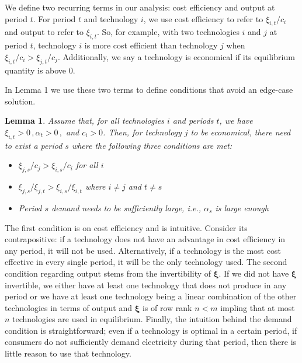 \documentclass[11pt,a4paper,leqno]{extarticle}
\newtheorem{lemma}{Lemma}
\begin{document}
	We define two recurring terms in our analysis: cost efficiency and output at period $t$. For period $t$ and technology $i$, we use cost efficiency to refer to $\xi_{i,t}/c_i$ and output to refer to $\xi_{i,t}$. So, for example, with two technologies $i$ and $j$ at period $t$, technology $i$ is more cost efficient than technology $j$ when $\xi_{i,t}/c_i > \xi_{j,t}/c_j$. Additionally, we say a technology is economical if its equilibrium quantity is above 0.
	
	In Lemma 1 we use these two terms to define conditions that avoid an edge-case solution.
	\begin{lemma}
		Assume that, for all technologies $i$ and periods $t$, we have $\xi_{i,t} > 0 \, , \alpha_t > 0 \, ,$ and $ c_i > 0$. Then, for technology $j$ to be economical, there need to exist a period $s$ where the following three conditions are met:
		\begin{itemize}
			\item $\xi_{j,s}/c_j > \xi_{i,s}/c_i$ for all $i$
			\item $\xi_{j,s}/\xi_{j,t} >  \xi_{i,s}/\xi_{i,t} $ where $i \neq j$ and $t \neq s$
			\item Period $s$ demand needs to be sufficiently large, i.e., $\alpha_s$ is large enough
		\end{itemize}
	\end{lemma}
	
	The first condition is on cost efficiency and is intuitive. Consider its contrapositive: if a technology does not have an advantage in cost efficiency in any period, it will not be used. Alternatively, if a technology is the most cost effective in every single period, it will be the only technology used. The second condition regarding output stems from the invertibility of $\boldsymbol{\xi}$. If we did not have $\boldsymbol{\xi}$ invertible, we either have at least one technology that does not produce in any period or we have at least one technology being a linear combination of the other technologies in terms of output and $\boldsymbol{\xi}$ is of row rank $n < m$ impling that at most $n$ technologies are used in equilibrium. Finally, the intuition behind the demand condition is straightforward; even if a technology is optimal in a certain period, if consumers do not sufficiently demand electricity during that period, then there is little reason to use that technology. 
	
\end{document}
